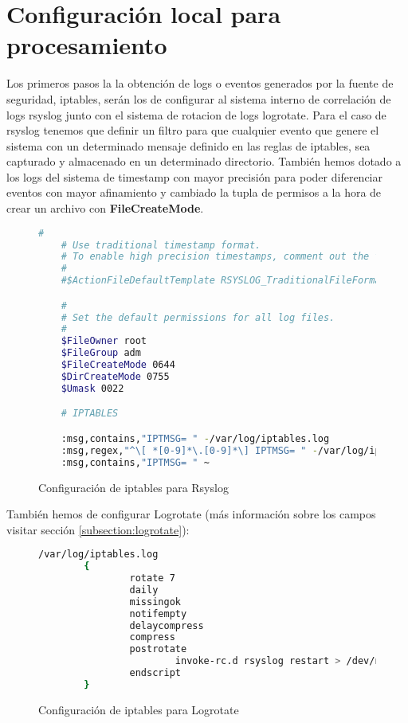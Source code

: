 \section[Configuración local]{Configuración local para procesamiento}
Los primeros pasos la la obtención de logs o eventos generados por la fuente de seguridad, iptables, serán los de configurar al sistema interno de correlación de logs rsyslog junto con el sistema de rotacion de logs logrotate. Para el caso de rsyslog tenemos que definir un filtro para que cualquier evento que genere el sistema con un determinado mensaje definido en las reglas de iptables, sea capturado y almacenado en un determinado directorio. También hemos dotado a los logs del sistema de timestamp con mayor precisión para poder diferenciar eventos con mayor afinamiento y cambiado la tupla de permisos a la hora de crear un archivo con \textbf{FileCreateMode}.

\begin{figure}[H]
  \begin{lstlisting}[language=bash]
    #
    # Use traditional timestamp format.
    # To enable high precision timestamps, comment out the following line.
    #
    #$ActionFileDefaultTemplate RSYSLOG_TraditionalFileFormat

    #
    # Set the default permissions for all log files.
    #
    $FileOwner root
    $FileGroup adm
    $FileCreateMode 0644
    $DirCreateMode 0755
    $Umask 0022

    # IPTABLES

    :msg,contains,"IPTMSG= " -/var/log/iptables.log
    :msg,regex,"^\[ *[0-9]*\.[0-9]*\] IPTMSG= " -/var/log/iptables.log
    :msg,contains,"IPTMSG= " ~

  \end{lstlisting}
  \caption{Configuración de iptables para Rsyslog}
\end{figure}
\pagebreak
También hemos de configurar Logrotate (más información sobre los campos visitar sección \ref{subsection:logrotate}):

\begin{figure}[H]
\begin{lstlisting}[language=bash]
/var/log/iptables.log
        {
                rotate 7
                daily
                missingok
                notifempty
                delaycompress
                compress
                postrotate
                        invoke-rc.d rsyslog restart > /dev/null
                endscript
        }
\end{lstlisting}
\caption{Configuración de iptables para Logrotate}
\end{figure}

